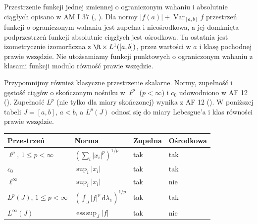 Przestrzenie funkcji jednej zmiennej o ograniczonym
wahaniu i absolutnie ciągłych opisano w AM I 37
(,
).
Dla normy $|f(a)|+\operatorname{Var}_{[a,b]}f$
przestrzeń funkcji o ograniczonym wahaniu jest
zupełna i nieośrodkowa, a jej domknięta podprzestrzeń
funkcji absolutnie ciągłych jest ośrodkowa.
Ta ostatnia jest izometrycznie izomorficzna z
$\R\times L^1([a,b])$, przez wartości w $a$
i klasę pochodnej prawie wszędzie.
Nie utożsamiamy funkcji punktowych o ograniczonym
wahaniu z klasami funkcji modulo równość prawie wszędzie.

Przypomnijmy również klasyczne przestrzenie
skalarne. Normy, zupełność i gęstość
ciągów o skończonym nośniku w $\ell^p$
($p<\infty$) i $c_0$ udowodniono
w AF 12 ().
Zupełność $L^p$ (nie tylko dla miary skończonej)
wynika z AF 12 ().
W poniższej tabeli $J=[a,b]$, $a<b$,
a $L^p(J)$ odnosi się do miary Lebesgue'a
i klas równości prawie wszędzie.

\begin{center}
\small
\begin{tabular}{llll}
Przestrzeń & Norma & Zupełna & Ośrodkowa\\ \hline
$\ell^p$, $1\le p<\infty$ &
 $(\sum_i|x_i|^p)^{1/p}$ & tak & tak\\
$c_0$ & $\sup_i|x_i|$ & tak & tak\\
$\ell^\infty$ & $\sup_i|x_i|$ & tak & nie\\
$L^p(J)$, $1\le p<\infty$ &
 $(\int_J|f|^p\,\mathrm d\lambda_1)^{1/p}$ & tak & tak\\
$L^\infty(J)$ & $\operatorname{ess\,sup}_J|f|$ & tak & nie
\end{tabular}
\end{center}

